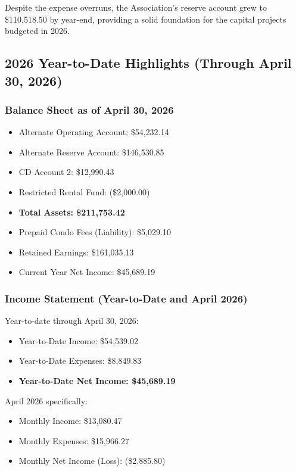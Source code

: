 \documentclass[11pt]{article}
\newcommand{\strong}[1]{\textbf{#1}}
\newcommand{\money}[1]{\$#1}
\begin{document}
\noindent
Despite the expense overruns, the Association's reserve account grew to \money{110{,}518.50}
by year-end, providing a solid foundation for the capital projects budgeted in 2026.

\subsection{2026 Year-to-Date Highlights (Through April 30, 2026)}

\subsubsection*{Balance Sheet as of April 30, 2026}
\vspace{-0.6em}

\begin{itemize}[leftmargin=1.1em]
    \item Alternate Operating Account: \money{54{,}232.14}
    \item Alternate Reserve Account: \money{146{,}530.85}
    \item CD Account 2: \money{12{,}990.43}
    \item Restricted Rental Fund: (\money{2{,}000.00})
    \item \strong{Total Assets: \money{211{,}753.42}}
    \item Prepaid Condo Fees (Liability): \money{5{,}029.10}
    \item Retained Earnings: \money{161{,}035.13}
    \item Current Year Net Income: \money{45{,}689.19}
\end{itemize}

\subsubsection*{Income Statement (Year-to-Date and April 2026)}
\vspace{-0.6em}

Year-to-date through April 30, 2026:
\begin{itemize}[leftmargin=1.1em]
    \item Year-to-Date Income: \money{54{,}539.02}
    \item Year-to-Date Expenses: \money{8{,}849.83}
    \item \strong{Year-to-Date Net Income: \money{45{,}689.19}}
\end{itemize}

April 2026 specifically:
\begin{itemize}[leftmargin=1.1em]
    \item Monthly Income: \money{13{,}080.47}
    \item Monthly Expenses: \money{15{,}966.27}
    \item Monthly Net Income (Loss): (\money{2{,}885.80})
\end{itemize}
\end{document}

